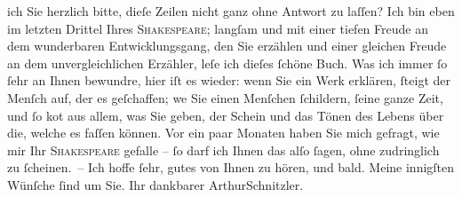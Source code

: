 \begin{ledgroupsized}[t]{13cm}
                    ich Sie herzlich bitte, dieſe Zeilen nicht ganz ohne Antwort zu laſſen?\pend
           \pstart
           Ich \introOben{}bin\introOben{} eben im letzten Drittel Ihres \textsc{Shakespeare}; langſam und mit einer tiefen Freude an dem wunderbaren {\pb}Entwicklungsgang, den Sie erzählen und
                    einer gleichen Freude an dem unvergleichlichen Erzähler, leſe ich dieſes ſchöne
                    Buch. Was ich immer ſo ſehr an Ihnen bewundre, hier iſt es wieder: wenn Sie ein
                    Werk erklären, ſteigt der Menſch auf, der es geſchaffen; we{\geminationn}
               Sie einen Menſchen ſchildern, ſeine ganze Zeit,
                    und {\pb}ſo ko{\geminationm}t aus
                    allem, was Sie geben, der Schein und das Tönen des Lebens über die, welche es
                    faſſen können. Vor ein paar Monaten haben Sie mich gefragt, wie mir Ihr
                        \textsc{Shakespeare} gefalle – ſo darf ich Ihnen das alſo ſagen, ohne zudringlich zu
                    ſcheinen. –\pend
           \pstart Ich hoffe ſehr, gutes von Ihnen zu hören, und bald. Meine innigſten Wünſche
                    ſind um Sie. Ihr dankbarer \spacefill\mbox{ArthurSchnitzler.}\pend{}          \endnumbering{}\end{ledgroupsized}  \newcommand{\dateiname}{L00696}\newcommand{\titel}{Arthur Schnitzler an Georg Brandes, 9. 7. 1897}\newcommand{\editorInnen}{Martin Anton Müller und Gerd-Hermann Susen}
            \footnotesize
\begin{ledgroupsized}[t]{11.5cm}
\end{ledgroupsized}
         
      